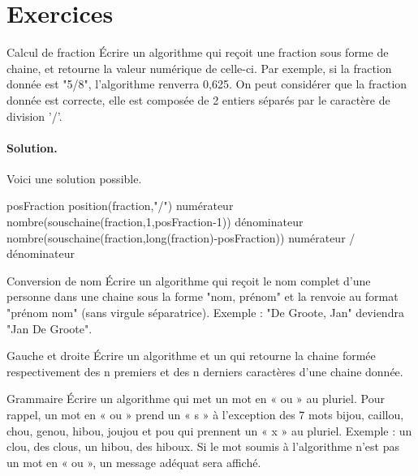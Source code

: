 \section{Exercices}

	\begin{Exercice}{Calcul de fraction}
		Écrire un algorithme 
		qui reçoit une fraction sous forme de chaine, 
		et retourne la valeur numérique de celle-ci. 
		Par exemple, si la fraction donnée est "5/8", 
		l'algorithme renverra 0,625. 
		On peut considérer que la fraction donnée est correcte, 
		elle est composée de 2 entiers séparés 
		par le caractère de division '/'.
		
		\paragraph{Solution.}
		Voici une solution possible.
		\begin{LDA}
				\Let posFraction \Gets position(fraction,"/")
				\Let numérateur \Gets nombre(souschaine(fraction,1,posFraction-1))
				\Let dénominateur \Gets nombre(souschaine(fraction,long(fraction)-posFraction))
				\Return numérateur / dénominateur
			\EndAlgo
		\end{LDA}
	\end{Exercice}
	
	\begin{Exercice}{Conversion de nom}
		Écrire un algorithme 
		qui reçoit le nom complet d'une personne 
		dans une chaine sous la forme "nom, prénom" 
		et la renvoie au format "prénom nom" 
		(sans virgule séparatrice). 
		Exemple : "De Groote, Jan" deviendra "Jan De Groote".	
	\end{Exercice}
	
	\begin{Exercice}{Gauche et droite}
		Écrire un algorithme  
		et un 
		qui retourne la chaine formée respectivement 
		des n premiers et des n derniers caractères d'une chaine donnée.	
	\end{Exercice}
	
	\begin{Exercice}{Grammaire}
		Écrire un algorithme 
		qui met un mot en « ou » au pluriel. 
		Pour rappel, 
		un mot en « ou » prend un « s » à l'exception des 7 mots 
		bijou, caillou, chou, genou, hibou, joujou et pou qui prennent 
		un « x » au pluriel. 
		Exemple : un clou, des clous, un hibou, des hiboux. 
		Si le mot soumis à l'algorithme n'est pas un mot en « ou », 
		un message adéquat sera affiché.
	\end{Exercice}

